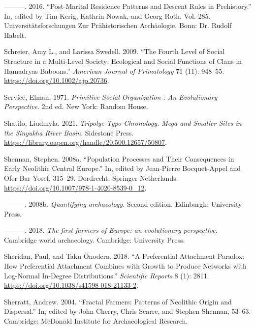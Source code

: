 \documentclass[
  12pt,
  a4paper, twoside]{book}
\newlength{\cslhangindent}
\newlength{\cslentryspacingunit} %
\newenvironment{CSLReferences}[2] %
 {%
  \setlength{\parindent}{0pt}
  \ifodd #1
  \let\oldpar\par
  \def\par{\hangindent=\cslhangindent\oldpar}
  \fi
  \setlength{\parskip}{#2\cslentryspacingunit}
 }%
 {}
\begin{document}
\begin{CSLReferences}{1}{0}
\leavevmode{}%
---------. 2016. {``Post-Marital Residence Patterns and Descent Rules in Prehistory.''} In, edited by Tim Kerig, Kathrin Nowak, and Georg Roth. Vol. 285. Universitätsforschungen Zur Prähistorischen Archäologie. Bonn: Dr. Rudolf Habelt.

\leavevmode{}%
Schreier, Amy L., and Larissa Swedell. 2009. {``The Fourth Level of Social Structure in a Multi-Level Society: Ecological and Social Functions of Clans in Hamadryas Baboons.''} \emph{American Journal of Primatology} 71 (11): 948--55. \url{https://doi.org/10.1002/ajp.20736}.

\leavevmode{}%
Service, Elman. 1971. \emph{Primitive Social Organization : An Evolutionary Perspective}. 2nd ed. New York: Random House.

\leavevmode{}%
Shatilo, Liudmyla. 2021. \emph{Tripolye Typo-Chronology. Mega and Smaller Sites in the Sinyukha River Basin}. Sidestone Press. \url{https://library.oapen.org/handle/20.500.12657/50807}.

\leavevmode{}%
Shennan, Stephen. 2008a. {``Population Processes and Their Consequences in Early Neolithic Central Europe.''} In, edited by Jean-Pierre Bocquet-Appel and Ofer Bar-Yosef, 315--29. Dordrecht: Springer Netherlands. \url{https://doi.org/10.1007/978-1-4020-8539-0_12}.

\leavevmode{}%
---------. 2008b. \emph{Quantifying archaeology}. Second edition. Edinburgh: University Press.

\leavevmode{}%
---------. 2018. \emph{The first farmers of Europe: an evolutionary perspective}. Cambridge world archaeology. Cambridge: University Press.

\leavevmode{}%
Sheridan, Paul, and Taku Onodera. 2018. {``A Preferential Attachment Paradox: How Preferential Attachment Combines with Growth to Produce Networks with Log-Normal In-Degree Distributions.''} \emph{Scientific Reports} 8 (1): 2811. \url{https://doi.org/10.1038/s41598-018-21133-2}.

\leavevmode{}%
Sherratt, Andrew. 2004. {``Fractal Farmers: Patterns of Neolithic Origin and Dispersal.''} In, edited by John Cherry, Chris Scarre, and Stephen Shennan, 53--63. Cambridge: McDonald Institute for Archaeological Research.


\end{CSLReferences}
\end{document}
